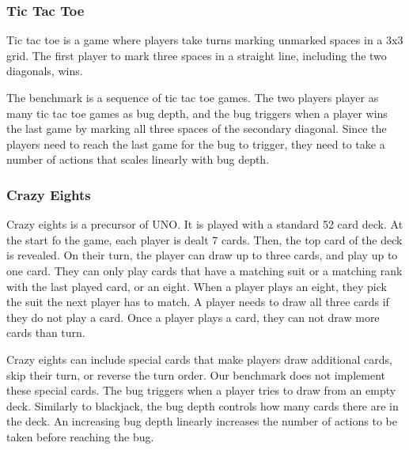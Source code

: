 \subsubsection{Tic Tac Toe}
Tic tac toe is a game where players take turns marking unmarked spaces in a 3x3 grid.
The first player to mark three spaces in a straight line, including the two diagonals, wins.

The benchmark is a sequence of tic tac toe games.
The two players player as many tic tac toe games as bug depth, and the bug triggers when a player wins the last game by marking all three spaces of the secondary diagonal.
Since the players need to reach the last game for the bug to trigger, they need to take a number of actions that scales linearly with bug depth.

\subsubsection{Crazy Eights}
Crazy eights is a precursor of UNO. It is played with a standard 52 card deck.
At the start fo the game, each player is dealt 7 cards.
Then, the top card of the deck is revealed. On their turn, the player can draw up to three cards, and play up to one card.
They can only play cards that have a matching suit or a matching rank with the last played card, or an eight.
When a player plays an eight, they pick the suit the next player has to match.
A player needs to draw all three cards if they do not play a card. Once a player plays a card, they can not draw more cards than turn.

Crazy eights can include special cards that make players draw additional cards, skip their turn, or reverse the turn order.
Our benchmark does not implement these special cards. The bug triggers when a player tries to draw from an empty deck.
Similarly to blackjack, the bug depth controls how many cards there are in the deck.
An increasing bug depth linearly increases the number of actions to be taken before reaching the bug.


